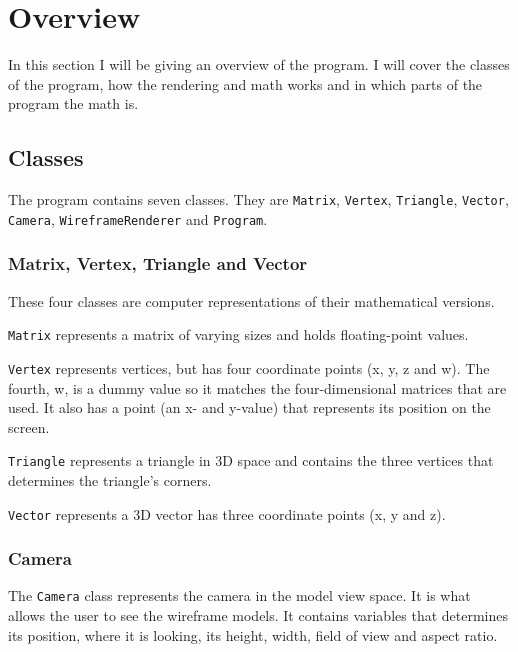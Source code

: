 \section{Overview}
\label{03}

In this section I will be giving an overview of the program. I will cover the classes of the program, how the rendering and math works and in which parts of the program the math is.

\subsection{Classes}
\label{03_01}
The program contains seven classes. They are \texttt{Matrix}, \texttt{Vertex}, \texttt{Triangle}, \texttt{Vector}, \texttt{Camera}, \texttt{WireframeRenderer} and \texttt{Program}.

\subsubsection*{Matrix, Vertex, Triangle and Vector}
These four classes are computer representations of their mathematical versions. 
\begin{my_itemize}
	\item \texttt{Matrix} represents a matrix of varying sizes and holds floating-point values. 

	\item \texttt{Vertex} represents vertices, but has four coordinate points (x, y, z and w). The fourth, w, is a dummy value so it matches the four-dimensional matrices that are used. It also has a point (an x- and y-value) that represents its position on the screen.

	\item \texttt{Triangle} represents a triangle in 3D space and contains the three vertices that determines the triangle's corners.

	\item \texttt{Vector} represents a 3D vector has three coordinate points (x, y and z).
\end{my_itemize}

\subsubsection*{Camera}
The \texttt{Camera} class represents the camera in the model view space. It is what allows the user to see the wireframe models. It contains variables that determines its position, where it is looking, its height, width, field of view and aspect ratio.

